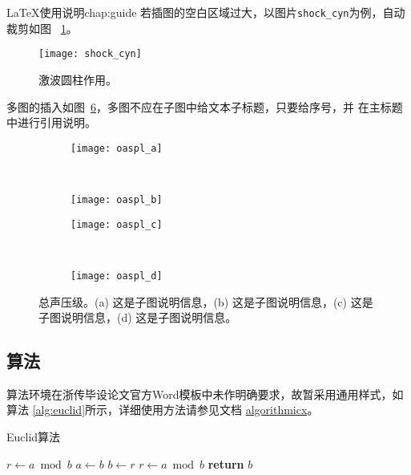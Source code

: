 \begin{cuzchapter}{\LaTeX{}使用说明}{chap:guide}
	若插图的空白区域过大，以图片\verb|shock_cyn|为例，自动裁剪如图
	~\ref{fig:shock_cyn}。
	\begin{figure}[h]
		\centering
		\texttt{[image: shock\_cyn]}
		\caption[激波圆柱作用]{激波圆柱作用。}
		\label{fig:shock_cyn}
	\end{figure}

	多图的插入如图~\ref{fig:oaspl}，多图不应在子图中给文本子标题，只要给序号，并
	在主标题中进行引用说明。
	\begin{figure}[h]
		\centering
		\begin{subfigure}[b]{0.35\textwidth}
			\texttt{[image: oaspl\_a]}
			\caption{}
			\label{fig:oaspl_a}
		\end{subfigure}%
		~%
		\begin{subfigure}[b]{0.35\textwidth}
			\texttt{[image: oaspl\_b]}
			\caption{}
			\label{fig:oaspl_b}
		\end{subfigure}
		\begin{subfigure}[b]{0.35\textwidth}
			\texttt{[image: oaspl\_c]}
			\caption{}
			\label{fig:oaspl_c}
		\end{subfigure}%
		~%
		\begin{subfigure}[b]{0.35\textwidth}
			\texttt{[image: oaspl\_d]}
			\caption{}
			\label{fig:oaspl_d}
		\end{subfigure}
		\caption[总声压级]{总声压级。(a) 这是子图说明信息，(b) 这是子图说明信息，(c) 这是子图说明信息，(d) 这是子图说明信息。}
		\label{fig:oaspl}
	\end{figure}

	\subsection{算法}\label{sub:algorithms}

	算法环境在浙传毕设论文官方Word模板中未作明确要求，故暂采用通用样式，如算法
	\ref{alg:euclid}所示，详细使用方法请参见文档
	\href{https://ctan.org/pkg/algorithmicx?lang=en}{algorithmicx}。

	\begin{algorithm}[h]
		\small
		\caption{Euclid算法}\label{alg:euclid}
		\begin{algorithmic}[1]
			\State $r\gets a\bmod b$
			\State $a\gets b$
			\State $b\gets r$
			\State $r\gets a\bmod b$
			\EndWhile\label{euclidendwhile}
			\State \textbf{return} $b$
			\EndProcedure
		\end{algorithmic}
	\end{algorithm}


\end{cuzchapter}
